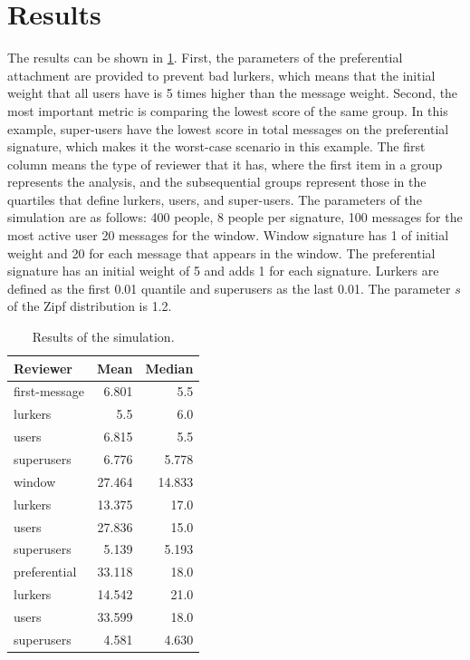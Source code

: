 \documentclass[11pt,congress]{ieeetran}
\begin{document}
\section{Results}
\label{sec:org715c89b}
The results can be shown in \ref{tab:results}. First, the parameters of the preferential attachment are provided to prevent bad lurkers, which means that the initial weight that all users have is 5 times higher than the message weight. Second, the most important metric is comparing the lowest score of the same group. In this example, super-users have the lowest score in total messages on the preferential signature, which makes it the worst-case scenario in this example. The first column means the type of reviewer that it has, where the first item in a group represents the analysis, and the subsequential groups represent those in the quartiles that define lurkers, users, and super-users. The parameters of the simulation are as follows: 400 people, 8 people per signature, 100 messages for the most active user 20 messages for the window. Window signature has 1 of initial weight and 20 for each message that appears in the window. The preferential signature has an initial weight of 5 and adds 1 for each signature. Lurkers are defined as the first 0.01 quantile and superusers as the last 0.01. The parameter \(s\) of the Zipf distribution is 1.2.

\begin{table}[htbp]
\caption{\label{tab:results}Results of the simulation.}
\centering
\begin{tabular}{lrr}
Reviewer & Mean & Median\\[0pt]
\hline
first-message & 6.801 & 5.5\\[0pt]
lurkers & 5.5 & 6.0\\[0pt]
users & 6.815 & 5.5\\[0pt]
superusers & 6.776 & 5.778\\[0pt]
\hline
window & 27.464 & 14.833\\[0pt]
lurkers & 13.375 & 17.0\\[0pt]
users & 27.836 & 15.0\\[0pt]
superusers & 5.139 & 5.193\\[0pt]
\hline
preferential & 33.118 & 18.0\\[0pt]
lurkers & 14.542 & 21.0\\[0pt]
users & 33.599 & 18.0\\[0pt]
superusers & 4.581 & 4.630\\[0pt]
\end{tabular}
\end{table}
\end{document}
